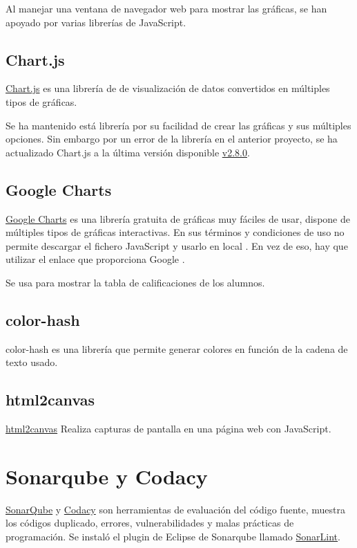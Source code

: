 Al manejar una ventana de navegador web para mostrar las gráficas, se han apoyado por varias librerías de JavaScript.

\subsection{Chart.js}
\href{https://www.chartjs.org/}{Chart.js} es una librería de de visualización de datos convertidos en múltiples tipos de gráficas.

Se ha mantenido está librería por su facilidad de crear las gráficas y sus múltiples opciones. Sin embargo por un error de la librería en el anterior proyecto, se ha actualizado Chart.js a la última versión disponible \href{https://www.chartjs.org/dist/2.8.0/Chart.min.js}{v2.8.0}.

\subsection{Google Charts}

\href{https://developers.google.com/chart/}{Google Charts} es una librería gratuita de gráficas muy fáciles de usar, dispone de múltiples tipos de gráficas interactivas. En sus términos y condiciones de uso no permite descargar el fichero JavaScript y usarlo en local \cite{noauthor_frequently_nodate}. En vez de eso, hay que utilizar el enlace que proporciona Google \cite{noauthor_quick_nodate}.

Se usa para mostrar la tabla de calificaciones de los alumnos. 

\subsection{color-hash}

color-hash \cite{zeng_generate_2019} es una librería que permite generar colores en función de la cadena de texto usado.

\subsection{html2canvas}

\href{https://html2canvas.hertzen.com/}{html2canvas}
Realiza capturas de pantalla en una página web con JavaScript.



\section{Sonarqube y Codacy}

\href{https://www.sonarqube.org/}{SonarQube} y \href{https://www.codacy.com/}{Codacy} son herramientas de evaluación del código fuente, muestra los códigos duplicado, errores, vulnerabilidades y malas prácticas de programación. 
Se instaló el plugin de Eclipse de Sonarqube llamado \href{https://www.sonarlint.org/}{SonarLint}.

